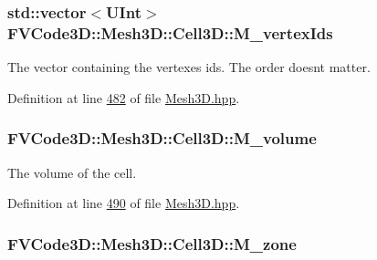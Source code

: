 \subsubsection[{\texorpdfstring{M\+\_\+vertex\+Ids}{M_vertexIds}}]{\setlength{\rightskip}{0pt plus 5cm}std\+::vector$<${\bf U\+Int}$>$ F\+V\+Code3\+D\+::\+Mesh3\+D\+::\+Cell3\+D\+::\+M\+\_\+vertex\+Ids\hspace{0.3cm}{\ttfamily [private]}}\hypertarget{classFVCode3D_1_1Mesh3D_1_1Cell3D_a1c43369fa1a00208ff3293aad35a70aa}{}\label{classFVCode3D_1_1Mesh3D_1_1Cell3D_a1c43369fa1a00208ff3293aad35a70aa}


The vector containing the vertexes ids. The order doesn\textquotesingle{}t matter. 



Definition at line \hyperlink{Mesh3D_8hpp_source_l00482}{482} of file \hyperlink{Mesh3D_8hpp_source}{Mesh3\+D.\+hpp}.

\subsubsection[{\texorpdfstring{M\+\_\+volume}{M_volume}}]{ F\+V\+Code3\+D\+::\+Mesh3\+D\+::\+Cell3\+D\+::\+M\+\_\+volume\hspace{0.3cm}{\ttfamily [private]}}\hypertarget{classFVCode3D_1_1Mesh3D_1_1Cell3D_a7616a6d28fcd8013bc52f4d754569e60}{}\label{classFVCode3D_1_1Mesh3D_1_1Cell3D_a7616a6d28fcd8013bc52f4d754569e60}


The volume of the cell. 



Definition at line \hyperlink{Mesh3D_8hpp_source_l00490}{490} of file \hyperlink{Mesh3D_8hpp_source}{Mesh3\+D.\+hpp}.

\subsubsection[{\texorpdfstring{M\+\_\+zone}{M_zone}}]{ F\+V\+Code3\+D\+::\+Mesh3\+D\+::\+Cell3\+D\+::\+M\+\_\+zone\hspace{0.3cm}{\ttfamily [private]}}\hypertarget{classFVCode3D_1_1Mesh3D_1_1Cell3D_ae984573970908f2c3080d4091a076e7f}{}\label{classFVCode3D_1_1Mesh3D_1_1Cell3D_ae984573970908f2c3080d4091a076e7f}


